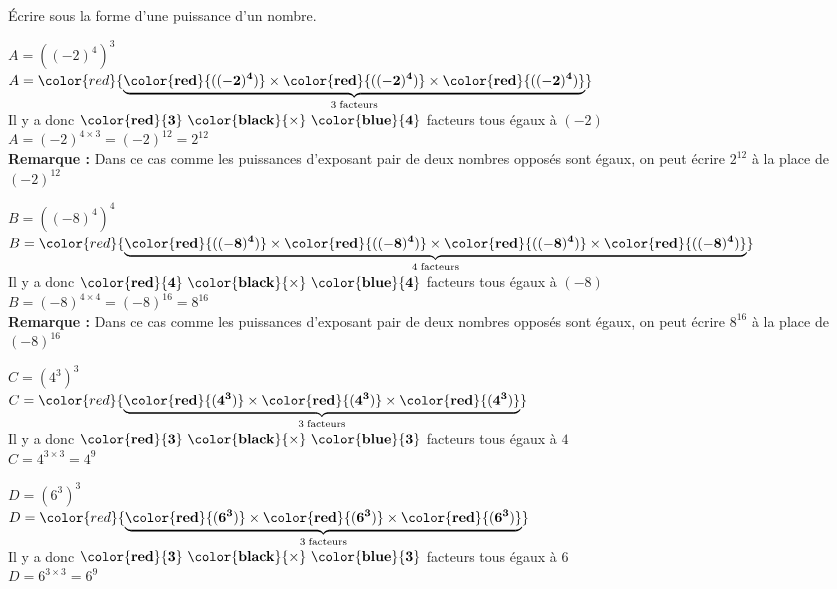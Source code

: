     Écrire sous la forme d'une puissance d'un nombre.
    \begin{itemize}
        \def\item{} %
        \item  $A=\left((-2)^4\right)^{3}$\\
        $A=\color{red}{\underbrace{\mathbf{\color{red}{((-2)^4)}} \times \mathbf{\color{red}{((-2)^4)}}\times \mathbf{\color{red}{((-2)^4)}}}_{3\thickspace\text{facteurs}}}$\\
        Il y a donc $\mathbf{\color{red}{3}~\color{black}{\times}~\color{blue}{4}}$ facteurs tous égaux à $(-2)$\\
        $A=(-2)^{4\times3} = (-2)^{12}=  2^{12}$\\
        \textbf{Remarque : } Dans ce cas comme les puissances d'exposant pair de deux nombres opposés sont égaux, on peut écrire $ 2^{12}$ à la place de $(-2)^{12}$

        \bigskip
        \item $B=\left((-8)^4\right)^{4}$\\
        $B=\color{red}{\underbrace{\mathbf{\color{red}{((-8)^4)}} \times \mathbf{\color{red}{((-8)^4)}}\times \mathbf{\color{red}{((-8)^4)}}\times \mathbf{\color{red}{((-8)^4)}}}_{4\thickspace\text{facteurs}}}$\\
        Il y a donc $\mathbf{\color{red}{4}~\color{black}{\times}~\color{blue}{4}}$ facteurs tous égaux à $(-8)$\\
        $B=(-8)^{4\times4} = (-8)^{16}=  8^{16}$\\
        \textbf{Remarque : } Dans ce cas comme les puissances d'exposant pair de deux nombres opposés sont égaux, on peut écrire $ 8^{16}$ à la place de $(-8)^{16}$

        \bigskip
        \item $C=\left(4^3\right)^{3}$\\
        $C=\color{red}{\underbrace{\mathbf{\color{red}{(4^3)}} \times \mathbf{\color{red}{(4^3)}}\times \mathbf{\color{red}{(4^3)}}}_{3\thickspace\text{facteurs}}}$\\
        Il y a donc $\mathbf{\color{red}{3}~\color{black}{\times}~\color{blue}{3}}$ facteurs tous égaux à $4$\\
        $C=4^{3\times3} = 4^{9}$

        \bigskip
        \item $D=\left(6^3\right)^{3}$\\
        $D=\color{red}{\underbrace{\mathbf{\color{red}{(6^3)}} \times \mathbf{\color{red}{(6^3)}}\times \mathbf{\color{red}{(6^3)}}}_{3\thickspace\text{facteurs}}}$\\
        Il y a donc $\mathbf{\color{red}{3}~\color{black}{\times}~\color{blue}{3}}$ facteurs tous égaux à $6$\\
        $D=6^{3\times3} = 6^{9}$
    \end{itemize}
